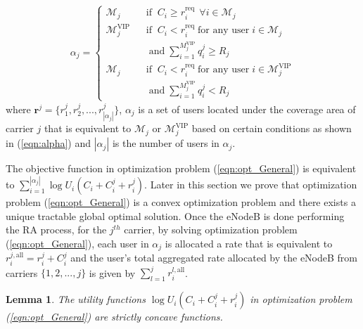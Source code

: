 \documentclass[journal]{IEEEtran} 				\IEEEoverridecommandlockouts 						\usepackage{amsmath,amssymb}
\newtheorem{lem}[thm]{Lemma}
\begin{document}
\begin{equation}\label{eqn:alpha}
\begin{aligned}
\alpha_j=
\begin{cases}
	\mathcal{M}_j \;\; & \text{if}\;\; C_i \geq r_i^{\text{req}}\:\:\forall i \in \mathcal{M}_j\\
	\mathcal{M}_j^{\text{VIP}}\;\;\; & \text{if}\;\; C_i < r_i^{\text{req}} \; \text{for any user} \; i \in \mathcal{M}_j \\
    & \; \text{and} \; \sum_{i=1}^{M_j^{\text{VIP}}} q_i^j \geq R_j\\
    \mathcal{M}_j \;\; & \text{if}\;\; C_i < r_i^{\text{req}} \; \text{for any user} \; i \in \mathcal{M}_j^{\text{VIP}}\\
    & \; \text{and} \; \sum_{i=1}^{M_j^{\text{VIP}}} q_i^j < R_j
\end{cases}
\end{aligned}
\end{equation}
where $\textbf{r}^j =\{r_1^j,r_2^j,...,r_{|\alpha_j|}^j\}$, $\alpha_j$ is a set of users located under the coverage area of carrier $j$ that is equivalent to $\mathcal{M}_j$ or $\mathcal{M}_j^{\text{VIP}}$ based on certain conditions as shown in (\ref{eqn:alpha}) and $|\alpha_j|$ is the number of users in $\alpha_j$.

The objective function in optimization problem (\ref{eqn:opt_General}) is equivalent to $\sum_{i=1}^{|\alpha_j|}\log U_i(C_i+C_i^j+r_i^j)$. Later in this section we prove that optimization problem (\ref{eqn:opt_General}) is a convex optimization problem and there exists a unique tractable global optimal solution. Once the eNodeB is done performing the RA process, for the $j^{th}$ carrier, by solving optimization problem (\ref{eqn:opt_General}), each user in $\alpha_j$ is allocated a rate that is equivalent to $r_i^{j,\text{all}}=r_i^j+C_i^j$ and the user's total aggregated rate allocated by the eNodeB from carriers $\{1,2,...,j\}$ is given by $\sum_{l=1}^{j}r_i^{l,\text{all}}$.

\begin{lem}\label{lem:concavity}
The utility functions $\log U_i(C_i+C_i^j+r_i^j)$ in optimization problem (\ref{eqn:opt_General}) are strictly concave functions.
\end{lem}
\end{document}

